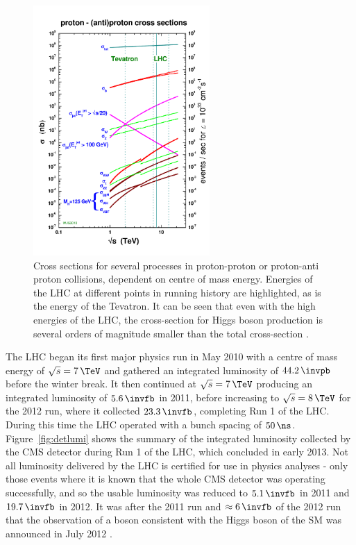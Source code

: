 \begin{figure}[htbp]
   \includegraphics[width=0.6\textwidth]{plots/detector/crosssections2012_v5.pdf}
\caption[Cross sections for several processes in proton-proton or proton-anti
proton collisions, dependent on centre of mass energy.]
{Cross sections for several processes in proton-proton or proton-anti
proton collisions, dependent on centre of mass energy. Energies of the LHC at
different points in running history are highlighted, as is the energy of the
Tevatron. It can be seen that even with the high energies of the LHC, the
cross-section for Higgs boson production is several orders of magnitude smaller than
the total cross-section \cite{stirling:xsecs}.}
\label{fig:LHCcrosssections}
\end{figure}

The LHC began its first major physics run in May 2010 with a centre of mass
energy of $\sqrt{s} = 7\,\TeV$ and gathered an integrated luminosity of $44.2\,\invpb$
before the winter break. It then continued at $\sqrt{s} = 7\,\TeV$
producing an integrated luminosity of $5.6\,\invfb$ in 2011, before increasing to
$\sqrt{s} = 8\,\TeV$ for the 2012 run, where it collected $23.3\,\invfb$,
completing Run 1 of the LHC.
During this time the LHC operated with a bunch spacing of $50\,\ns$. 
Figure~\ref{fig:detlumi} shows the summary of the
integrated luminosity collected by the CMS detector during Run 1 of the LHC,
which concluded in early 2013. Not all luminosity delivered by the LHC is
certified for use in physics analyses - only those events where it is known that
the whole CMS detector was operating successfully, and so the usable luminosity
was reduced to $5.1\,\invfb$ in 2011 and $19.7\,\invfb$ in 2012.
It was after the 2011 run and $\approx6\,\invfb$ of the 2012 run that the
observation of a boson consistent with the Higgs boson of the \ac{SM} was
announced in July 2012 \cite{CMSobservation125,ATLASobservation125}. 

